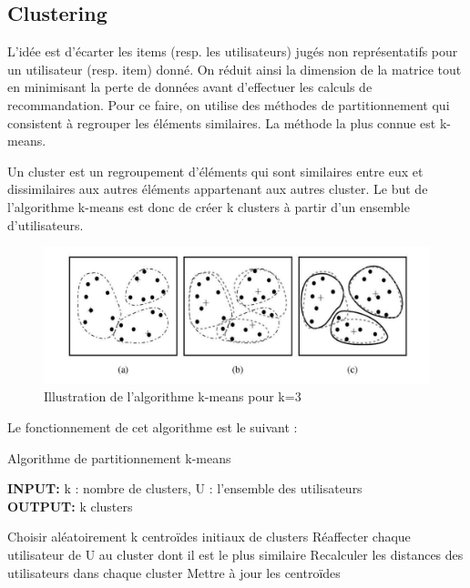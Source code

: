 \subsection{Clustering}
L’idée est d’écarter les items (resp. les utilisateurs) jugés non représentatifs pour un utilisateur (resp. item) donné. On réduit ainsi la dimension de la matrice tout en minimisant la perte de données avant d’effectuer les calculs de recommandation.
Pour ce faire, on utilise des méthodes de partitionnement qui consistent à regrouper les éléments similaires. La méthode la plus connue est k-means.\par
Un cluster est un regroupement d'éléments qui sont similaires entre eux et dissimilaires aux autres éléments appartenant aux autres cluster. Le but de l'algorithme k-means est donc de créer k clusters à partir d'un ensemble d'utilisateurs.

\begin{figure}[H]
	\begin{center}
		\includegraphics[scale=0.27]{img/k_means.png}
	\end{center}
	\caption{Illustration de l'algorithme k-means pour k=3}
\end{figure}
\newpage
Le fonctionnement de cet algorithme est le suivant :
\begin{algorithm}
\caption{Algorithme de partitionnement k-means}
\textbf{INPUT:} k : nombre de clusters, U : l'ensemble des utilisateurs\\
\textbf{OUTPUT:} k clusters
\begin{algorithmic}
\STATE Choisir aléatoirement k centroïdes initiaux de clusters
\REPEAT
\STATE Réaffecter chaque utilisateur de U au cluster dont il est le plus similaire
\STATE Recalculer les distances des utilisateurs dans chaque cluster
\STATE Mettre à jour les centroïdes
\end{algorithmic}
\end{algorithm}

